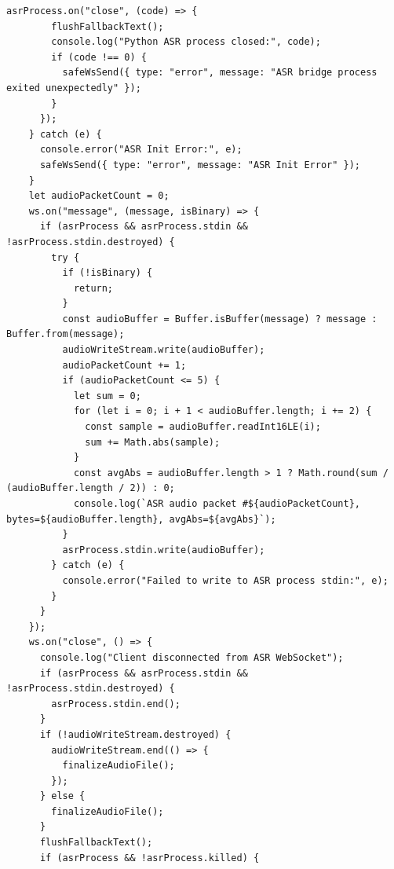 \documentclass[12pt,a4paper]{article}
\begin{document}
\begin{Verbatim}[fontsize=\footnotesize]
      asrProcess.on("close", (code) => {
        flushFallbackText();
        console.log("Python ASR process closed:", code);
        if (code !== 0) {
          safeWsSend({ type: "error", message: "ASR bridge process exited unexpectedly" });
        }
      });
    } catch (e) {
      console.error("ASR Init Error:", e);
      safeWsSend({ type: "error", message: "ASR Init Error" });
    }
    let audioPacketCount = 0;
    ws.on("message", (message, isBinary) => {
      if (asrProcess && asrProcess.stdin && !asrProcess.stdin.destroyed) {
        try {
          if (!isBinary) {
            return;
          }
          const audioBuffer = Buffer.isBuffer(message) ? message : Buffer.from(message);
          audioWriteStream.write(audioBuffer);
          audioPacketCount += 1;
          if (audioPacketCount <= 5) {
            let sum = 0;
            for (let i = 0; i + 1 < audioBuffer.length; i += 2) {
              const sample = audioBuffer.readInt16LE(i);
              sum += Math.abs(sample);
            }
            const avgAbs = audioBuffer.length > 1 ? Math.round(sum / (audioBuffer.length / 2)) : 0;
            console.log(`ASR audio packet #${audioPacketCount}, bytes=${audioBuffer.length}, avgAbs=${avgAbs}`);
          }
          asrProcess.stdin.write(audioBuffer);
        } catch (e) {
          console.error("Failed to write to ASR process stdin:", e);
        }
      }
    });
    ws.on("close", () => {
      console.log("Client disconnected from ASR WebSocket");
      if (asrProcess && asrProcess.stdin && !asrProcess.stdin.destroyed) {
        asrProcess.stdin.end();
      }
      if (!audioWriteStream.destroyed) {
        audioWriteStream.end(() => {
          finalizeAudioFile();
        });
      } else {
        finalizeAudioFile();
      }
      flushFallbackText();
      if (asrProcess && !asrProcess.killed) {
\end{Verbatim}
\newpage
{}
\fancyhead[R]{}
\end{document}
